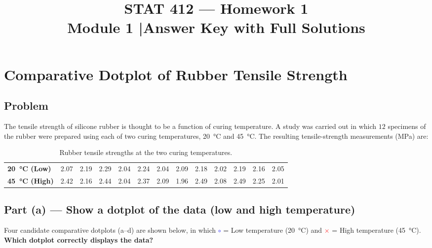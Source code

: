 \documentclass[11pt]{article}
\title{\vspace{-1.5em}\textbf{STAT 412 — Homework 1}\\[2pt]
       \large Module 1 \quad|\quad Answer Key with Full Solutions}
\author{}
\date{}
\begin{document}
\maketitle
\thispagestyle{fancy}
\vspace{-2.5em}

\section{Comparative Dotplot of Rubber Tensile Strength}

\subsection*{Problem}
The tensile strength of silicone rubber is thought to be a function of curing
temperature. A study was carried out in which $12$ specimens of the rubber were
prepared using each of two curing temperatures, \SI{20}{\celsius} and
\SI{45}{\celsius}. The resulting tensile-strength measurements (MPa) are:

\begin{table}[H]
\centering
\renewcommand{\arraystretch}{1.25}
\begin{tabular}{l *{12}{c}}
\toprule
\textbf{\SI{20}{\celsius} (Low)}
 & 2.07 & 2.19 & 2.29 & 2.04 & 2.24 & 2.04
 & 2.09 & 2.18 & 2.02 & 2.19 & 2.16 & 2.05 \\
\textbf{\SI{45}{\celsius} (High)}
 & 2.42 & 2.16 & 2.44 & 2.04 & 2.37 & 2.09
 & 1.96 & 2.49 & 2.08 & 2.49 & 2.25 & 2.01 \\
\bottomrule
\end{tabular}
\caption{Rubber tensile strengths at the two curing temperatures.}
\end{table}

\subsection*{Part (a) — Show a dotplot of the data (low and high temperature)}

\noindent
Four candidate comparative dotplots (a–d) are shown below, in which
\textcolor{blue}{$\circ$} = Low temperature (\SI{20}{\celsius}) and
\textcolor{red}{$\times$} = High temperature (\SI{45}{\celsius}).
\textbf{Which dotplot correctly displays the data?}
\end{document}
